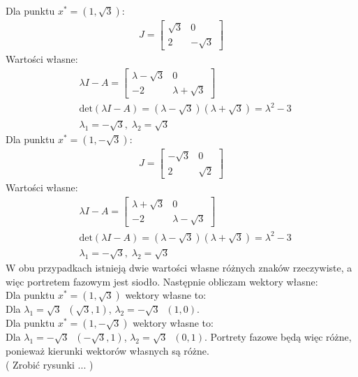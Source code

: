 \documentclass[a4paper,11pt]{article}
\begin{document}
Dla punktu \( x^* = (1, \sqrt{3}) \):
\begin{align*}
J = 
\begin{bmatrix}
\sqrt{3} & 0 \\
2 & - \sqrt{3} 
\end{bmatrix}
\end{align*}
Wartości własne:
\begin{align*}
&\lambda I - A = 
\begin{bmatrix}
\lambda - \sqrt{3} & 0 \\
-2 & \lambda + \sqrt{3}
\end{bmatrix} \\
&\text{det} ( \lambda I - A ) = (\lambda - \sqrt{3})(\lambda + \sqrt{3}) = \lambda ^2 -3 \\
& \lambda _1 = -\sqrt{3} , \; \lambda _2 = \sqrt{3}
\end{align*}
Dla punktu \( x^* = ( 1, -\sqrt{3}) \):
\begin{align*}
J = 
\begin{bmatrix}
-\sqrt{3} & 0 \\
2 & \sqrt{2}
\end{bmatrix}
\end{align*}
Wartości własne:
\begin{align*}
&\lambda I - A = 
\begin{bmatrix}
\lambda + \sqrt{3} & 0 \\
-2 & \lambda - \sqrt{3}
\end{bmatrix} \\
&\text{det} ( \lambda I - A ) = (\lambda - \sqrt{3})(\lambda + \sqrt{3}) = \lambda ^2 -3 \\
& \lambda _1 = -\sqrt{3} , \; \lambda _2 = \sqrt{3}
\end{align*}
W obu przypadkach istnieją dwie wartości własne różnych znaków rzeczywiste, a więc portretem fazowym jest siodło. 
Następnie obliczam wektory własne: \\
Dla punktu \( x^* = (1, \sqrt{3}) \) wektory własne to: \\
Dla \( \lambda _1  = \sqrt{3} \; \; (\sqrt{3}, 1) \), \( \lambda _2 = -\sqrt{3} \; \; (1,0) \). \\
Dla punktu \( x^* = (1, -\sqrt{3}) \) wektory własne to: \\
Dla \( \lambda _1  = -\sqrt{3} \; \; (-\sqrt{3},1) \), \( \lambda _2 = \sqrt{3} \; \; (0,1) \). 
Portrety fazowe będą więc różne, ponieważ kierunki wektorów własnych są różne. \\
( Zrobić rysunki ... )
\end{document}
